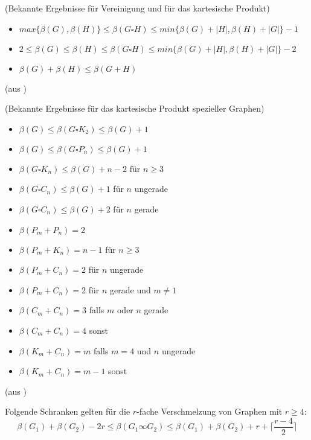 \begin{lem}(Bekannte Ergebnisse für Vereinigung und für das kartesische Produkt)
\begin{itemize}
\item $max\{\beta(G),\beta(H)\}\leq \beta(G\square H) \leq min\{\beta(G)+|H|,\beta(H)+|G|\}-1$
\item $2 \leq \beta(G) \leq \beta(H) \leq \beta(G\square H) \leq min\{\beta(G)+|H|,\beta(H)+|G|\}-2$
\item $\beta(G)+\beta(H) \leq \beta(G+H)$
\end{itemize} 
(aus \cite{some families of graphs})
\end{lem}

\begin{lem}(Bekannte Ergebnisse für das kartesische Produkt spezieller Graphen)
\begin{itemize}
\item $\beta(G)\leq \beta(G\square K_2) \leq \beta(G)+1$
\item $\beta(G)\leq \beta(G\square P_n) \leq \beta(G)+1$
\item $\beta(G\square K_n) \leq \beta(G)+n-2$ für $n \geq 3$
\item $\beta(G\square C_n) \leq \beta(G)+1$ für $n$ ungerade
\item $\beta(G\square C_n) \leq \beta(G)+2$ für $n$ gerade
\item $\beta(P_m+P_n)=2$
\item $\beta(P_m+K_n)=n-1$ für $n\geq 3$
\item $\beta(P_m+C_n)=2$ für $n$ ungerade
\item $\beta(P_m+C_n)=2$ für $n$ gerade und $m \neq 1$
\item $\beta(C_m+C_n)=3$ falls $m$ oder $n$ gerade
\item $\beta(C_m+C_n)=4$ sonst
\item $\beta(K_m+C_n)=m$ falls $m=4$ und $n$ ungerade
\item $\beta(K_m+C_n)=m-1$ sonst
\end{itemize} 
(aus \cite{some families of graphs})
\end{lem}

\begin{lem}$\;\;$\\Folgende Schranken gelten für die $r$-fache Verschmelzung von Graphen mit $r \geq 4$:
$$\beta(G_1)+\beta(G_2)-2r \leq \beta(G_1 \infty G_2) \leq \beta(G_1)+\beta(G_2)+r+\lceil\frac{r-4}{2}\rceil$$
\end{lem}

